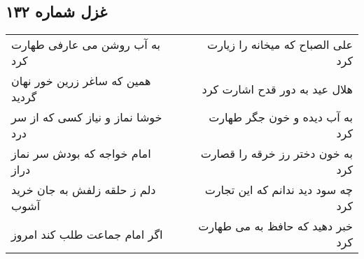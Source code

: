 \begin{center}
\section*{غزل شماره ۱۳۲}
\label{sec:sh132}
\begin{longtable}{l p{0.5cm} r}
به آب روشن می عارفی طهارت کرد
&&
علی الصباح که میخانه را زیارت کرد
\\
همین که ساغر زرین خور نهان گردید
&&
هلال عید به دور قدح اشارت کرد
\\
خوشا نماز و نیاز کسی که از سر درد
&&
به آب دیده و خون جگر طهارت کرد
\\
امام خواجه که بودش سر نماز دراز
&&
به خون دختر رز خرقه را قصارت کرد
\\
دلم ز حلقه زلفش به جان خرید آشوب
&&
چه سود دید ندانم که این تجارت کرد
\\
اگر امام جماعت طلب کند امروز
&&
خبر دهید که حافظ به می طهارت کرد
\\
\end{longtable}
\end{center}
